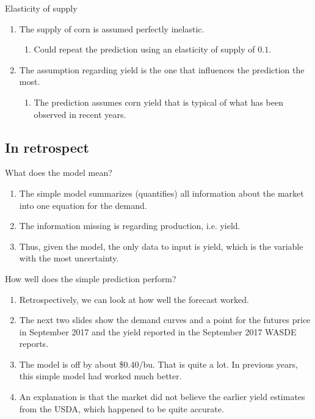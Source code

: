 \documentclass[table,xcolor=pdftex,dvipsnames, handout]{beamer}\usepackage[]{graphicx}\usepackage[]{color}
\begin{document}
\begin{frame}{Elasticity of supply}
\begin{enumerate}[label=\textbullet]
  \item The supply of corn is assumed perfectly inelastic.
        \begin{enumerate}[label=-]
         \item Could repeat the prediction using an elasticity of supply of $0.1$.
        \end{enumerate}
  \item The assumption regarding yield is the one that influences the prediction the most.
        \begin{enumerate}[label=-]
         \item The prediction assumes corn yield that is typical of what has been observed in recent years.
        \end{enumerate}
\end{enumerate}
\end{frame}


\subsection{In retrospect}

\begin{frame}{What does the model mean?}
\begin{enumerate}[label=\textbullet]
  \item The simple model summarizes (quantifies) all information about the market into one equation for the demand.
  \item The information missing is regarding production, i.e. yield.
  \item Thus, given the model, the only data to input is yield, which is the variable with the most uncertainty.
\end{enumerate}
\end{frame}


\begin{frame}{How well does the simple prediction perform?}\label{slide.retro}
\begin{enumerate}[label=\textbullet]
  \item Retrospectively, we can look at how well the forecast worked.
  \item The next two slides show the demand curves and a point for the futures price in September 2017 and the yield reported in the September 2017 WASDE reports.
  \item The model is off by about \$0.40/bu. That is quite a lot. In previous years, this simple model had worked much better.
  \item An explanation is that the market did not believe the earlier yield estimates from the USDA, which happened to be quite accurate. 
\end{enumerate}
\end{frame}
\end{document}
